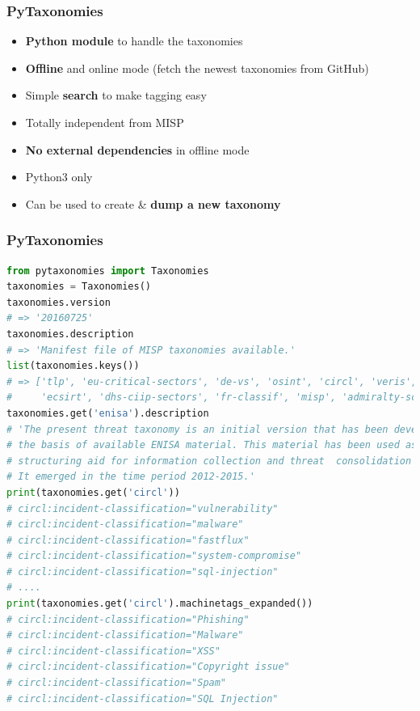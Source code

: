 \begin{frame}
        \frametitle{PyTaxonomies}
\begin{itemize}
    \item {\bf Python module} to handle the taxonomies
    \item {\bf Offline} and online mode (fetch the newest taxonomies from GitHub)
    \item Simple {\bf search} to make tagging easy
        \item Totally independent from MISP
        \item {\bf No external dependencies} in offline mode
        \item Python3 only
        \item Can be used to create \& {\bf dump a new taxonomy}
\end{itemize}
\end{frame}

\begin{frame}[fragile]
        \frametitle{PyTaxonomies}
    \begin{lstlisting}[language=Python,basicstyle=\tiny]
from pytaxonomies import Taxonomies
taxonomies = Taxonomies()
taxonomies.version
# => '20160725'
taxonomies.description
# => 'Manifest file of MISP taxonomies available.'
list(taxonomies.keys())
# => ['tlp', 'eu-critical-sectors', 'de-vs', 'osint', 'circl', 'veris',
# 	  'ecsirt', 'dhs-ciip-sectors', 'fr-classif', 'misp', 'admiralty-scale', ...]
taxonomies.get('enisa').description
# 'The present threat taxonomy is an initial version that has been developed on
# the basis of available ENISA material. This material has been used as an ENISA-internal
# structuring aid for information collection and threat  consolidation purposes.
# It emerged in the time period 2012-2015.'
print(taxonomies.get('circl'))
# circl:incident-classification="vulnerability"
# circl:incident-classification="malware"
# circl:incident-classification="fastflux"
# circl:incident-classification="system-compromise"
# circl:incident-classification="sql-injection"
# ....
print(taxonomies.get('circl').machinetags_expanded())
# circl:incident-classification="Phishing"
# circl:incident-classification="Malware"
# circl:incident-classification="XSS"
# circl:incident-classification="Copyright issue"
# circl:incident-classification="Spam"
# circl:incident-classification="SQL Injection"

\end{lstlisting}
\end{frame}

